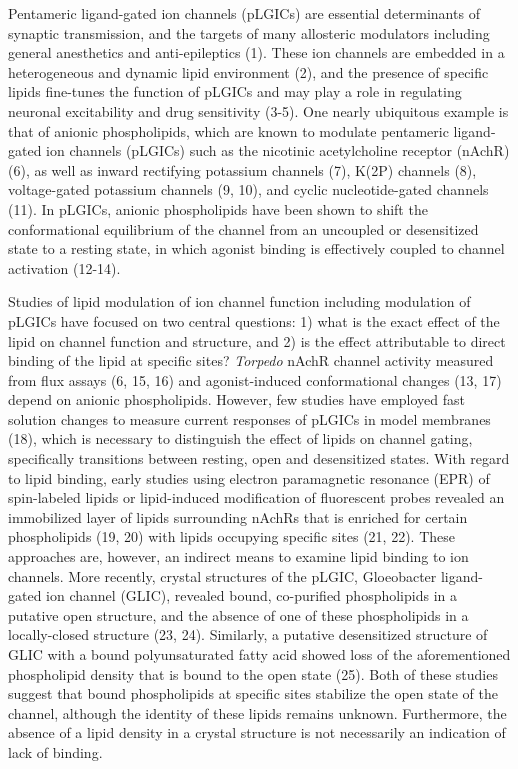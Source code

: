 Pentameric ligand-gated ion channels (pLGICs) are essential determinants
of synaptic transmission, and the targets of many allosteric modulators
including general anesthetics and anti-epileptics (1). These ion
channels are embedded in a heterogeneous and dynamic lipid environment
(2), and the presence of specific lipids fine-tunes the function of
pLGICs and may play a role in regulating neuronal excitability and drug
sensitivity (3-5). One nearly ubiquitous example is that of anionic
phospholipids, which are known to modulate pentameric ligand-gated ion
channels (pLGICs) such as the nicotinic acetylcholine receptor (nAchR)
(6), as well as inward rectifying potassium channels (7), K(2P) channels
(8), voltage-gated potassium channels (9, 10), and cyclic
nucleotide-gated channels (11). In pLGICs, anionic phospholipids have
been shown to shift the conformational equilibrium of the channel from
an uncoupled or desensitized state to a resting state, in which agonist
binding is effectively coupled to channel activation (12-14).

Studies of lipid modulation of ion channel function including modulation
of pLGICs have focused on two central questions: 1) what is the exact
effect of the lipid on channel function and structure, and 2) is the
effect attributable to direct binding of the lipid at specific sites?
\emph{Torpedo} nAchR channel activity measured from flux assays (6, 15,
16) and agonist-induced conformational changes (13, 17) depend on
anionic phospholipids. However, few studies have employed fast solution
changes to measure current responses of pLGICs in model membranes (18),
which is necessary to distinguish the effect of lipids on channel
gating, specifically transitions between resting, open and desensitized
states. With regard to lipid binding, early studies using electron
paramagnetic resonance (EPR) of spin-labeled lipids or lipid-induced
modification of fluorescent probes revealed an immobilized layer of
lipids surrounding nAchRs that is enriched for certain phospholipids
(19, 20) with lipids occupying specific sites (21, 22). These approaches
are, however, an indirect means to examine lipid binding to ion
channels. More recently, crystal structures of the pLGIC, Gloeobacter
ligand-gated ion channel (GLIC), revealed bound, co-purified
phospholipids in a putative open structure, and the absence of one of
these phospholipids in a locally-closed structure (23, 24). Similarly, a
putative desensitized structure of GLIC with a bound polyunsaturated
fatty acid showed loss of the aforementioned phospholipid density that
is bound to the open state (25). Both of these studies suggest that
bound phospholipids at specific sites stabilize the open state of the
channel, although the identity of these lipids remains unknown.
Furthermore, the absence of a lipid density in a crystal structure is
not necessarily an indication of lack of binding.

